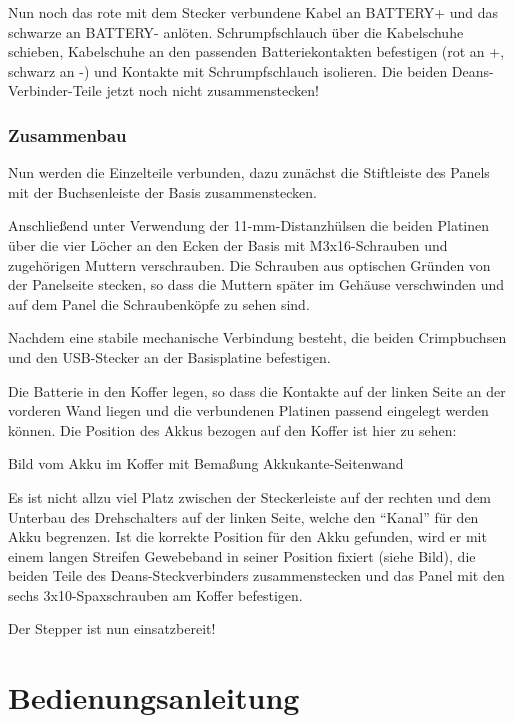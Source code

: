 \documentclass[paper=a4, open=any]{scrbook}
\begin{document}
				Nun noch das rote mit dem Stecker verbundene Kabel an BATTERY+ und das schwarze an BATTERY- anlöten. Schrumpfschlauch über die Kabelschuhe schieben, Kabelschuhe an den passenden Batteriekontakten befestigen (rot an +, schwarz an -) und Kontakte mit Schrumpfschlauch isolieren. Die beiden Deans-Verbinder-Teile jetzt noch nicht zusammenstecken!
				

			\section{Zusammenbau}
				Nun werden die Einzelteile verbunden, dazu zunächst die Stiftleiste des Panels mit der Buchsenleiste der Basis zusammenstecken.

				Anschließend unter Verwendung der 11-mm-Distanzhülsen die beiden Platinen über die vier Löcher an den Ecken der Basis mit M3x16-Schrauben und zugehörigen Muttern verschrauben. Die Schrauben aus optischen Gründen von der Panelseite stecken, so dass die Muttern später im Gehäuse verschwinden und auf dem Panel die Schraubenköpfe zu sehen sind.

				Nachdem eine stabile mechanische Verbindung besteht, die beiden Crimpbuchsen und den USB-Stecker an der Basisplatine befestigen.
				
				Die Batterie in den Koffer legen, so dass die Kontakte auf der linken Seite an der vorderen Wand liegen und die verbundenen Platinen passend eingelegt werden können. Die Position des Akkus bezogen auf den Koffer ist hier zu sehen:
				\begin{center}
					Bild vom Akku im Koffer mit Bemaßung Akkukante-Seitenwand
				\end{center}
				
				Es ist nicht allzu viel Platz zwischen der Steckerleiste auf der rechten und dem Unterbau des Drehschalters auf der linken Seite, welche den \enquote{Kanal} für den Akku begrenzen. Ist die korrekte Position für den Akku gefunden, wird er mit einem langen Streifen Gewebeband in seiner Position fixiert (siehe Bild), die beiden Teile des Deans-Steckverbinders zusammenstecken und das Panel mit den sechs 3x10-Spaxschrauben am Koffer befestigen.

				\begin{center}
					Der Stepper ist nun einsatzbereit!
				\end{center}
	\part{Bedienungsanleitung}
\end{document}
